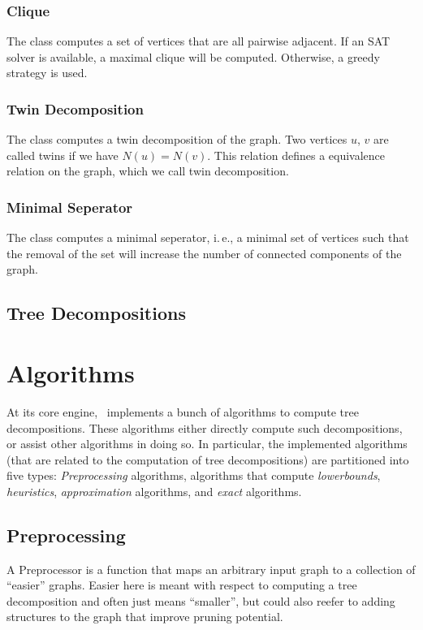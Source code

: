 \documentclass[a4paper, ukenglish, twoside, openright]{jdrasilmanual}
\begin{document}
\section{Clique}
The class  computes a set of vertices that are all pairwise adjacent. If an SAT
solver is available, a maximal clique will be computed. Otherwise, a
greedy strategy is used.

\section{Twin Decomposition}
The class  computes a twin decomposition of the graph. Two vertices $u$, $v$ are
called twins if we have $N(u)=N(v)$. This relation defines a
equivalence relation on the graph, which we call twin decomposition.

\section{Minimal Seperator}
The class  computes a minimal seperator, i.\,e., a minimal set of vertices such
that the removal of the set will increase the number of connected
components of the graph.

\chapter{Tree Decompositions}\label{chapter:treedecompositions}

\part{Algorithms}
At its core engine, \Jdrasil\ implements a bunch of algorithms to
compute tree decompositions. These algorithms either directly compute
such decompositions, or assist other algorithms in doing so. In
particular, the implemented algorithms (that are related to the
computation of tree decompositions) are partitioned into five types:
\emph{Preprocessing} algorithms, algorithms that compute
\emph{lowerbounds}, \emph{heuristics}, \emph{approximation}
algorithms, and \emph{exact} algorithms.

\chapter{Preprocessing}
A Preprocessor is a function that maps an arbitrary input graph to a collection of ``easier'' graphs. 
Easier here is meant with respect to computing a tree decomposition and often just means ``smaller'', but 
could also reefer to adding structures to the graph that improve pruning potential.
 
\end{document}
